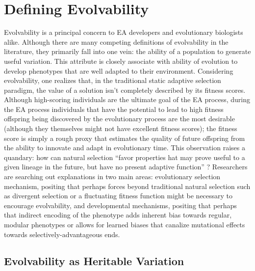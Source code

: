 \section{Defining Evolvability} \label{sec:defining_evolvability}

Evolvability is a principal concern to EA developers and evolutionary biologists alike. Although there are many competing definitions of evolvability in the literature, they primarily fall into one vein: the ability of a population to generate useful variation. This attribute is closely associate with ability of evolution to develop phenotypes that are well adapted to their environment. Considering evolvability, one realizes that, in the traditional static adaptive selection paradigm, the value of a solution isn't completely described by its fitness scores. Although high-scoring individuals are the ultimate goal of the EA process, during the EA process individuals that have the potential to lead to high fitness offspring being discovered by the evolutionary process are the most desirable (although they themselves might not have excellent fitness scores); the fitness score is simply a rough proxy that estimates the quality of future offspring from the  ability to innovate and adapt in evolutionary time. This observation raises a quandary: how can natural selection ``favor properties hat may prove useful to a given lineage in the future, but have no present adaptive function'' \cite{Pigliucci2008IsEvolvable}? Researchers are searching out explanations in two main areas: evolutionary selection mechanism, positing that perhaps forces beyond traditional natural selection such as divergent selection or a fluctuating fitness function might be necessary to encourage evolvability, and developmental mechanisms, positing that perhaps that indirect encoding of the phenotype adds inherent bias towards regular, modular phenotypes or allows for learned biases that canalize mutational effects towards selectively-advantageous ends.

\subsection{Evolvability as Heritable Variation}

